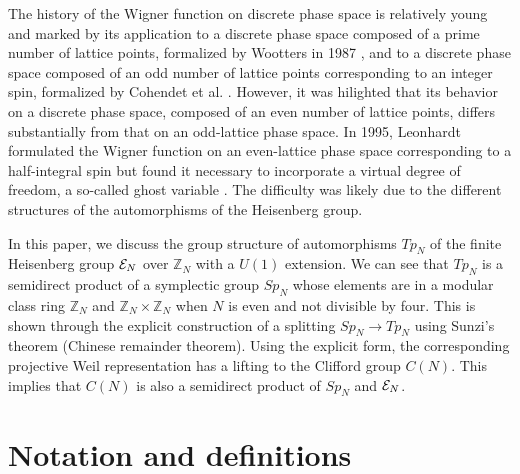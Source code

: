 \documentclass[12pt]{iopart}
\begin{document}
The history of the Wigner function on discrete phase space is
relatively young and marked by its application
to a discrete phase space composed of a prime number of lattice points,
formalized by Wootters in 1987 \cite{Wootters},
and to a discrete phase space composed of an odd number of lattice points
corresponding to an integer spin, formalized by Cohendet et al. \cite{Cohendet_1988}. 
However, it was hilighted that its behavior on a discrete phase space,
composed of an even number of lattice points, differs
substantially from that on an odd-lattice phase space.
%
In 1995, Leonhardt formulated the Wigner function on an even-lattice phase space
corresponding to a half-integral spin but found it necessary to incorporate
a virtual degree of freedom, a so-called ghost variable \cite{Leonhardt_1995,Leonhardt_1996}.
%
The difficulty was likely due to the different structures of the automorphisms
of the Heisenberg group.

In this paper, we discuss the group structure of automorphisms \(Tp_N\) of the finite Heisenberg group \({\cal E}_N\)
over \(\mathbb Z_N\) with a \(U(1)\) extension.
We can see that \(Tp_N\) is a semidirect product of a symplectic group \(Sp_N\)
whose elements are in a modular class ring \(\mathbb Z_N\) and \(\mathbb Z_N\times\mathbb Z_N\)
when \(N\) is even and not divisible by four.
This is shown through the explicit construction of a splitting \(Sp_N\rightarrow Tp_N\)
using Sunzi's theorem (Chinese remainder theorem).
Using the explicit form, the corresponding projective Weil representation
has a lifting to the Clifford group \(C(N)\). This implies that \(C(N)\) is also a semidirect
product of \(Sp_N\) and \({\cal E}_N\).

\section{Notation and definitions}
\end{document}
